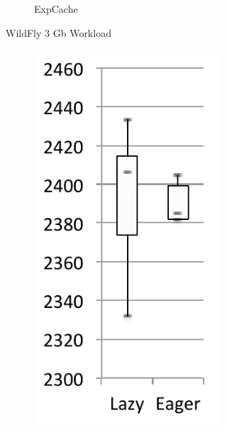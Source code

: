 \documentclass[sigplan,10pt,review,anonymous]{acmart}\settopmatter{printfolios=true,printccs=false,printacmref=false}
\begin{document}
\begin{figure}[bth]
\begin{subfigure}[b]{.48\textwidth}
\begin{subfigure}[b]{.28\textwidth}
		\caption{ExpCache}
	\end{subfigure}%
	\caption*{WildFly 3 Gb Workload\vspace{-0cm}}
	\end{subfigure}%
	\begin{subfigure}[b]{.48\textwidth}
    	\hspace{.03\textwidth}\begin{subfigure}[b]{.28\textwidth}
    		\includegraphics[width=\linewidth]{figures/wildflyLoadExecTime} 

\end{subfigure}
\end{subfigure}
\end{figure}
\end{document}
